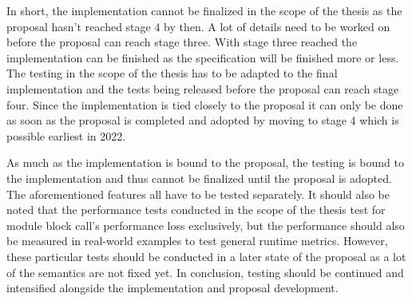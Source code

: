 In short, the implementation cannot be finalized in the scope of the thesis as the proposal hasn't reached stage 4 by then. A lot of details need to be worked on before the proposal can reach stage three. With stage three reached the implementation can be finished as the specification will be finished more or less. The testing in the scope of the thesis has to be adapted to the final implementation and the tests being released before the proposal can reach stage four. Since the implementation is tied closely to the proposal it can only be done as soon as the proposal is completed and adopted by moving to stage 4 which is possible earliest in 2022.

As much as the implementation is bound to the proposal, the testing is bound to the implementation and thus cannot be finalized until the proposal is adopted. The aforementioned features all have to be tested separately. It should also be noted that the performance tests conducted in the scope of the thesis test for module block call's performance loss exclusively, but the performance should also be measured in real-world examples to test general runtime metrics. However, these particular tests should be conducted in a later state of the proposal as a lot of the semantics are not fixed yet. In conclusion, testing should be continued and intensified alongside the implementation and proposal development.
